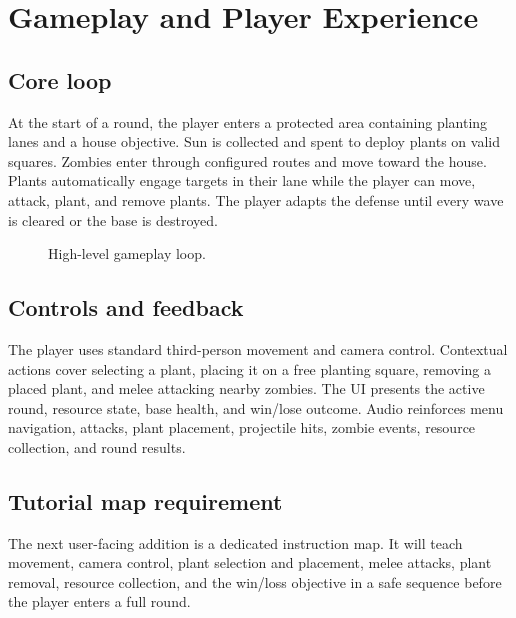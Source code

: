 \section{Gameplay and Player Experience}

\subsection{Core loop}
At the start of a round, the player enters a protected area containing planting lanes and a house objective. Sun is collected and spent to deploy plants on valid squares. Zombies enter through configured routes and move toward the house. Plants automatically engage targets in their lane while the player can move, attack, plant, and remove plants. The player adapts the defense until every wave is cleared or the base is destroyed.

\begin{figure}[H]
\centering
{}
\caption{High-level gameplay loop.}
\end{figure}

\subsection{Controls and feedback}
The player uses standard third-person movement and camera control. Contextual actions cover selecting a plant, placing it on a free planting square, removing a placed plant, and melee attacking nearby zombies. The UI presents the active round, resource state, base health, and win/lose outcome. Audio reinforces menu navigation, attacks, plant placement, projectile hits, zombie events, resource collection, and round results.

\subsection{Tutorial map requirement}
The next user-facing addition is a dedicated instruction map. It will teach movement, camera control, plant selection and placement, melee attacks, plant removal, resource collection, and the win/loss objective in a safe sequence before the player enters a full round.
